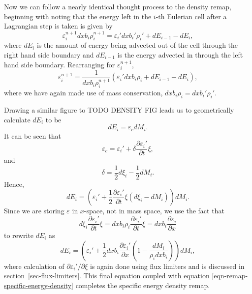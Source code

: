 Now we can follow a nearly identical thought process to the density remap, beginning with noting that the energy left in the $i$-th Eulerian cell after a Lagrangian step is taken is given by
\begin{equation}
  \varepsilon_i^{n+1} dxb_i \rho_i^{n+1} = \varepsilon_i' dxb_i' \rho_i' + dE_{i-1} - dE_i,
\end{equation}
where $dE_i$ is the amount of energy being advected out of the cell through the right hand side boundary and $dE_{i-1}$ is the energy advected in through the left hand side boundary. Rearranging for $\varepsilon_i^{n+1}$, 
\begin{equation}
  \varepsilon_i^{n+1}  = \frac{1}{dxb_i \rho_i^{n+1}}(\varepsilon_i' dxb_i \rho_i + dE_{i-1} - dE_i),
  \label{eqn-remap-specific-energy-density}
\end{equation}
where we have again made use of mass conservation, $dxb_i \rho_i = dxb_i' \rho_i'$.

Drawing a similar figure to TODO DENSITY FIG leads us to geometrically calculate $dE_i$ to be
\begin{equation}
  dE_i = \varepsilon_c dM_i.
\end{equation}
It can be seen that
\begin{equation}
  \varepsilon_c = \varepsilon_i' + \delta \frac{\partial \varepsilon_i'}{\partial t}{\xi},
\end{equation}
and
\begin{equation}
  \delta = \frac{1}{2}d\xi_i - \frac{1}{2}dM_i.
\end{equation}
Hence, 
\begin{equation}
  dE_i = \left( \varepsilon_i' + \frac{1}{2}\frac{\partial \varepsilon_i'}{\partial t}{\xi} (d\xi_i - dM_i) \right)dM_i.
\end{equation}
Since we are storing $\varepsilon$ in $x$-space, not in mass space, we use the fact that
\begin{equation}
  d\xi_i \frac{\partial \varepsilon_i'}{\partial t}{\xi} = dxb_i\rho_i \frac{\partial \varepsilon_i'}{\partial t}{\xi} = dxb_i \frac{\partial \varepsilon_i}{\partial x}
\end{equation}
to rewrite $dE_i$ as
\begin{equation}
  dE_i = \left( \varepsilon_i' + \frac{1}{2}dxb_i\frac{\partial \varepsilon_i'}{\partial x} \left( 1 - \frac{dM_i}{\rho_i dxb_i} \right) \right)dM_i,
  \label{eqn-remap-energy-difference}
\end{equation}
where calculation of $\partial \varepsilon_i'/\partial\xi$ is again done using flux limiters and is discussed in section~\ref{sec-flux-limiters}. This final equation coupled with equation \eqref{eqn-remap-specific-energy-density} completes the specific energy density remap.

